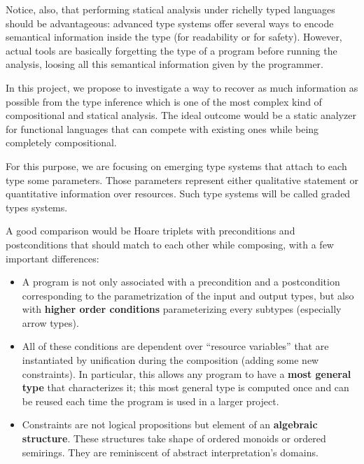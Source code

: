 \documentclass{article}[11pt]
\begin{document}
Notice, also, that performing statical analysis under richelly typed languages should be advantageous:  advanced type systems offer several ways to encode semantical information inside the type (for readability or for safety). However, actual tools are basically forgetting the type of a program before running the analysis, loosing all this semantical information given by the programmer.

In this project, we propose to investigate a way to recover as much information as possible from the type inference which is one of the most complex kind of compositional and statical analysis. The ideal outcome would be a static analyzer for functional languages that can compete with existing ones while being completely compositional.

For this purpose, we are focusing on emerging type systems that attach to each type some parameters. Those parameters represent either qualitative statement or quantitative information over resources. Such type systems will be called graded types systems.

A good comparison would be Hoare triplets with preconditions and postconditions that should match to each other while composing, with a few important differences:
\begin{itemize}
\item A program is not only associated with a precondition and a postcondition corresponding to the parametrization of the input and output types, but also with {\bf higher order conditions} parameterizing every subtypes (especially arrow types).
\item All of these conditions are dependent over ``resource variables'' that are instantiated by unification during the composition (adding some new constraints). In particular, this allows any program to have a {\bf most general type} that characterizes it; this most general type is computed once and can be reused each time the program is used in a larger project.
\item Constraints are not logical propositions but element of an {\bf algebraic structure}. These structures take shape of ordered monoids or ordered semirings. They are reminiscent of abstract interpretation's domains.
\end{itemize}
\end{document}
